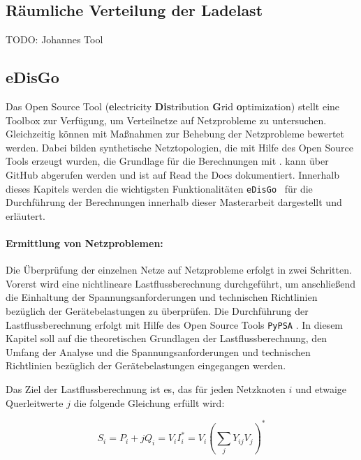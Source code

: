 \subsection{Räumliche Verteilung der Ladelast}

{\color{red} TODO: Johannes Tool}


\subsection{eDisGo}\label{chap:edisgo_theo}

Das Open Source Tool \edisgo (\textbf{e}lectricity \textbf{Dis}tribution \textbf{G}rid \textbf{o}ptimization) stellt eine Toolbox zur Verfügung, um Verteilnetze auf Netzprobleme zu untersuchen.
Gleichzeitig können mit \edisgo Maßnahmen zur Behebung der Netzprobleme bewertet werden.
Dabei bilden synthetische Netztopologien, die mit Hilfe des Open Source Tools \dingo erzeugt wurden, die Grundlage für die Berechnungen mit \edisgodot.
\edisgo kann über GitHub \cite{edisgoGit2019} abgerufen werden und ist auf Read the Docs \cite{edisgoDocs2017} dokumentiert.
Innerhalb dieses Kapitels werden die wichtigsten Funktionalitäten \texttt{eDisGo}~ für die Durchführung der Berechnungen innerhalb dieser Masterarbeit dargestellt und erläutert.


\paragraph{Ermittlung von Netzproblemen:}\label{chap:grid_issues}

Die Überprüfung der einzelnen Netze auf Netzprobleme erfolgt in zwei Schritten.
Vorerst wird eine nichtlineare Lastflussberechnung durchgeführt, um anschließend die Einhaltung der Spannungsanforderungen und technischen Richtlinien bezüglich der Gerätebelastungen zu überprüfen.
Die Durchführung der Lastflussberechnung erfolgt mit Hilfe des Open Source Tools \texttt{PyPSA} \cite{Brown2020}.
In diesem Kapitel soll auf die theoretischen Grundlagen der Lastflussberechnung, den Umfang der Analyse und die Spannungsanforderungen und technischen Richtlinien bezüglich der Gerätebelastungen eingegangen werden.\medskip

Das Ziel der Lastflussberechnung ist es, das für jeden Netzknoten $i$ und etwaige Querleitwerte $j$ die folgende Gleichung erfüllt wird:

\begin{equation}
	S_i = P_i + j Q_i = V_i I_i^* = V_i \left(\sum_j Y_{ij} V_j \right)^*
	\label{eq:pf}
\end{equation}

